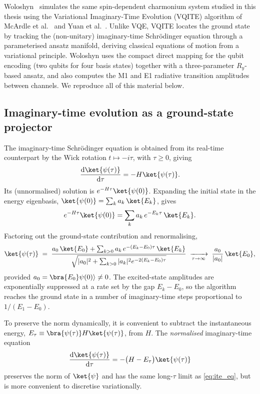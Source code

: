 Woloshyn~\cite{woloshyn2023} simulates the same spin-dependent charmonium
system studied in this thesis using the Variational
Imaginary-Time Evolution (VQITE) algorithm of McArdle et
al.~\cite{mcardle2019} and Yuan et al.~\cite{yuan2019}. Unlike VQE,
VQITE locates the ground state by tracking the (non-unitary)
imaginary-time Schr\"{o}dinger equation through a parameterised ansatz
manifold, deriving classical equations of motion from a variational
principle. Woloshyn uses the compact direct mapping for the qubit
encoding (two qubits for four basis states) together with a
three-parameter $R_y$-based ansatz, and also computes the M1 and E1
radiative transition amplitudes between channels. We reproduce all of
this material below.

\subsection{Imaginary-time evolution as a ground-state projector}
\label{ssec:ite}

The imaginary-time Schr\"{o}dinger equation is obtained from its real-time
counterpart by the Wick rotation $t \mapsto -i\tau$, with $\tau \geq 0$,
giving
\begin{equation}
  \label{eq:ite_eq}
  \frac{\mathrm{d}\ket{\psi(\tau)}}{\mathrm{d}\tau} = -H\ket{\psi(\tau)}.
\end{equation}
Its (unnormalised) solution is $e^{-H\tau}\ket{\psi(0)}$. Expanding the
initial state in the energy eigenbasis,
$\ket{\psi(0)} = \sum_k a_k\,\ket{E_k}$, gives
\begin{equation}
  \label{eq:ite_decomposition}
  e^{-H\tau}\ket{\psi(0)}
  = \sum_k a_k\,e^{-E_k\tau}\,\ket{E_k}.
\end{equation}
Factoring out the ground-state contribution and renormalising,
\begin{equation}
  \label{eq:ite_ground_state}
  \ket{\psi(\tau)}
  \;=\;
  \frac{a_0\,\ket{E_0} +
        \sum_{k>0} a_k\,e^{-(E_k - E_0)\tau}\,\ket{E_k}}
       {\sqrt{|a_0|^{2} + \sum_{k>0} |a_k|^{2} e^{-2(E_k - E_0)\tau}}}
  \;\xrightarrow[\tau\to\infty]{}\;
  \frac{a_0}{|a_0|}\,\ket{E_0},
\end{equation}
provided $a_0 = \bra{E_0}\psi(0)\rangle \neq 0$. The excited-state
amplitudes are exponentially suppressed at a rate set by the gap $E_k -
E_0$, so the algorithm reaches the ground state in a number of
imaginary-time steps proportional to $1/(E_1 - E_0)$.

To preserve the norm dynamically, it is convenient to subtract the
instantaneous energy,
$E_\tau \equiv \bra{\psi(\tau)} H \ket{\psi(\tau)}$, from $H$. The
\emph{normalised} imaginary-time equation
\begin{equation}
  \label{eq:ite_normalised}
  \frac{\mathrm{d}\ket{\psi(\tau)}}{\mathrm{d}\tau}
  = -\bigl(H - E_\tau\bigr)\ket{\psi(\tau)}
\end{equation}
preserves the norm of $\ket{\psi}$ and has the same long-$\tau$ limit as
\cref{eq:ite_eq}, but is more convenient to discretise variationally.


